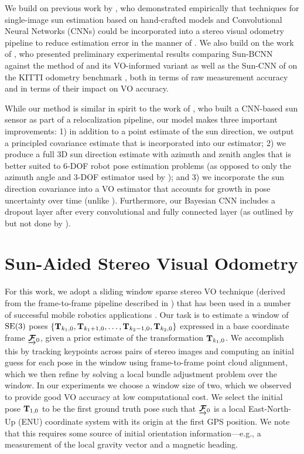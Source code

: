 We build on previous work by \citet{2017_Clement_Improving}, who demonstrated empirically that techniques for single-image sun estimation based on hand-crafted models \citep{Lalonde2011-jw} and Convolutional Neural Networks (CNNs) \citep{Ma2016-at} could be incorporated into a stereo visual odometry pipeline to reduce estimation error in the manner of \citet{Lambert2012-sn}.
We also build on the work of \citet{2017_Peretroukhin_Reducing}, who presented preliminary experimental results comparing Sun-BCNN against the method of \citet{Lalonde2011-jw} and its VO-informed variant \citep{2017_Clement_Improving} as well as the Sun-CNN of \citet{Ma2016-at} on the KITTI odometry benchmark \citep{Geiger2013-ky}, both in terms of raw measurement accuracy and in terms of their impact on VO accuracy.

While our method is similar in spirit to the work of \citet{Ma2016-at}, who built a CNN-based sun sensor as part of a relocalization pipeline, our model makes three important improvements: 1) in addition to a point estimate of the sun direction, we output a principled covariance estimate that is incorporated into our estimator; 2) we produce a full 3D sun direction estimate with azimuth and zenith angles that is better suited to 6-DOF robot pose estimation problems (as opposed to only the azimuth angle and 3-DOF estimator used by \citet{Ma2016-at}); and 3) we incorporate the sun direction covariance into a VO estimator that accounts for growth in pose uncertainty over time (unlike \citet{2017_Clement_Improving}). 
Furthermore, our Bayesian CNN includes a dropout layer after every convolutional and fully connected layer (as outlined by \citet{Gal2016-ny} but not done by \citet{Kendall2016-zf}).


\section{Sun-Aided Stereo Visual Odometry} 
\label{sec:sun_bcnn-stereo-vo}
For this work, we adopt a sliding window sparse stereo VO technique (derived from the frame-to-frame pipeline described in ) that has been used in a number of successful mobile robotics applications \citep{Cheng2006-nl,Furgale2010-to,Geiger2011-xe,Kelly2008-mh}.
Our task is to estimate a window of $\mathrm{SE}(3)$ poses $\left\{\boldsymbol{\mathbf{T}}_{k_1,0}, \boldsymbol{\mathbf{T}}_{k_1+1,0}, \dots, \boldsymbol{\mathbf{T}}_{k_2-1, 0}, \boldsymbol{\mathbf{T}}_{k_2, 0}\right\}$ expressed in a base coordinate frame $\underrightarrow{ \boldsymbol{\mathbf{\mathcal{F}}} }_{0}$, given a prior estimate of the transformation $\boldsymbol{\mathbf{T}}_{k_1,0}$.
We accomplish this by tracking keypoints across pairs of stereo images and computing an initial guess for each pose in the window using frame-to-frame point cloud alignment, which we then refine by solving a local bundle adjustment problem over the window.
In our experiments we choose a window size of two, which we observed to provide good VO accuracy at low computational cost. 
We select the initial pose $\boldsymbol{\mathbf{T}}_{1,0}$ to be the first ground truth pose such that $\underrightarrow{ \boldsymbol{\mathbf{\mathcal{F}}} }_{0}$ is a local East-North-Up (ENU) coordinate system with its origin at the first GPS position. We note that this requires some source of initial orientation information---e.g., a measurement of the local gravity vector and a magnetic heading.

